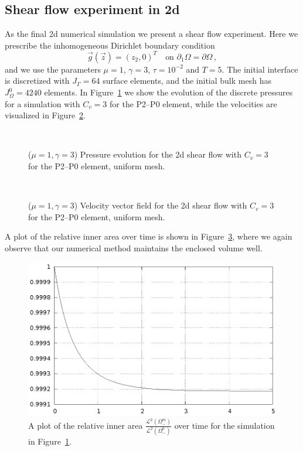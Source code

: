 \subsection{Shear flow experiment in 2d}
As the final 2d numerical simulation we present a shear flow experiment. Here
we prescribe the inhomogeneous Dirichlet boundary condition
\begin{equation*}
\vec g(\vec z)=(z_2,0)^T\quad \mbox{on }\partial_1\Omega=\partial\Omega\,,
\end{equation*}
and we use the parameters $\mu=1$, $\gamma=3$, $\tau=10^{-2}$ and $T=5$.
The initial interface is discretized with $J_\Gamma = 64$ surface elements,
and the initial bulk mesh has $J_\Omega^0 = 4240$ elements. In
Figure~\ref{fig:shear_2d} we show the evolution of the discrete pressures
for a simulation with $C_v=3$ for the P2--P0 element, while the velocities
are visualized in Figure~\ref{fig:shear_2d_velocity}.
\begin{figure}[htbp]
\centering
{}
\\
\caption[Stokes 2d shear flow pressure]
{($\mu=1,\gamma=3$) Pressure evolution for the 2d shear flow with $C_v=3$ for
the P2--P0 element, uniform mesh.}
\label{fig:shear_2d}
\end{figure}
\begin{figure}[htbp]
\centering
{}
\\
\caption[Stokes 2d shear flow velocity]
{($\mu=1,\gamma=3$) Velocity vector field for the 2d shear flow with $C_v=3$
for the P2--P0 element, uniform mesh.}
\label{fig:shear_2d_velocity}
\end{figure}

A plot of the relative inner area over time is shown in
Figure~\ref{fig:shear_2d_bulk_inner_volume}, where we again observe that our
numerical method maintains the enclosed volume well.
\begin{figure}[htbp]
\centering
\includegraphics[width=.45\textwidth]
{figures/stokes/2d_shear_bulk_inner_volume.ps}
\caption[Stokes 2d shear flow inner area]
{A plot of the relative inner area
$\frac{\mathcal{L}^2(\Omega^m_-)}{\mathcal{L}^2(\Omega^0_-)}$
over time for the simulation in Figure~\ref{fig:shear_2d}.}
\label{fig:shear_2d_bulk_inner_volume}
\end{figure}

